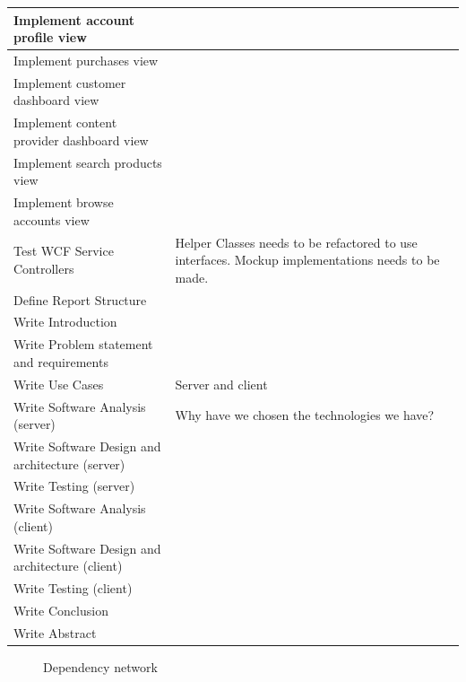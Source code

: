 \begin{longtable}{|p{200px}|p{200px}|}
	Implement account profile view & ~  \\ \hline
	Implement purchases view & ~  \\ \hline
	Implement customer dashboard view & ~  \\ \hline
	Implement content provider dashboard view & ~  \\ \hline
	Implement search products view & ~  \\ \hline
	Implement browse accounts view & ~  \\ 
	Test WCF Service Controllers & Helper Classes needs to be refactored to use interfaces. Mockup implementations needs to be made. \\ \hline
	Define Report Structure & ~  \\ \hline
	Write Introduction & ~  \\ \hline
	Write Problem statement and requirements & ~  \\ \hline
	Write Use Cases & Server and client  \\ \hline
	Write Software Analysis (server) & Why have we chosen the technologies we have? \\ \hline
	Write Software Design and architecture (server) & ~  \\ \hline
	Write Testing (server) & ~  \\ \hline
	Write Software Analysis (client) & ~  \\ \hline
	Write Software Design and architecture (client) & ~  \\ \hline
	Write Testing (client) & ~  \\ \hline
	Write Conclusion & ~  \\ \hline
	Write Abstract & ~  \\ \hline
\end{longtable}
\newpage

\begin{landscape}
\begin{figure}[H]
  
  \caption{Dependency network}
  \label{dependency_network}
\end{figure}
\end{landscape}

\newpage
\renewcommand{\section}[2]{} %